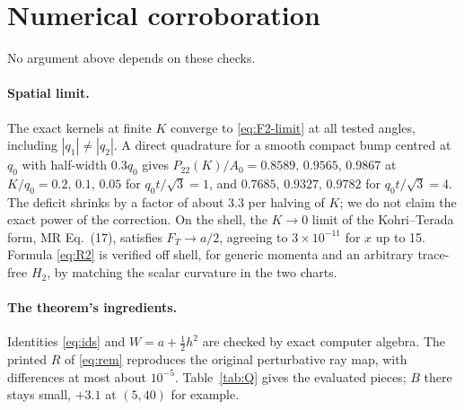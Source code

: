 \documentclass[10pt]{article}
\begin{document}
\appendix
\section{Numerical corroboration}\label{app:numerics}

No argument above depends on these checks.

\paragraph{Spatial limit.} The exact kernels at finite $K$ converge to \eqref{eq:F2-limit} at all tested angles, including $|q_1|\ne|q_2|$. A direct quadrature for a smooth compact bump centred at $q_0$ with half-width $0.3q_0$ gives $P_{22}(K)/A_0=0.8589,\,0.9565,\,0.9867$ at $K/q_0=0.2,\,0.1,\,0.05$ for $q_0t/\sqrt3=1$, and $0.7685,\,0.9327,\,0.9782$ for $q_0t/\sqrt3=4$. The deficit shrinks by a factor of about $3.3$ per halving of $K$; we do not claim the exact power of the correction. On the shell, the $K\to0$ limit of the Kohri--Terada form, MR Eq.~(17), satisfies $F_T\to a/2$, agreeing to $3\times10^{-11}$ for $x$ up to 15. Formula \eqref{eq:R2} is verified off shell, for generic momenta and an arbitrary trace-free $H_2$, by matching the scalar curvature in the two charts.

\paragraph{The theorem's ingredients.} Identities \eqref{eq:ids} and $W=a+\frac12h^2$ are checked by exact computer algebra. The printed $R$ of \eqref{eq:rem} reproduces the original perturbative ray map, with differences at most about $10^{-5}$. Table~\ref{tab:Q} gives the evaluated pieces; $B$ there stays small, $+3.1$ at $(5,40)$ for example.
\end{document}
